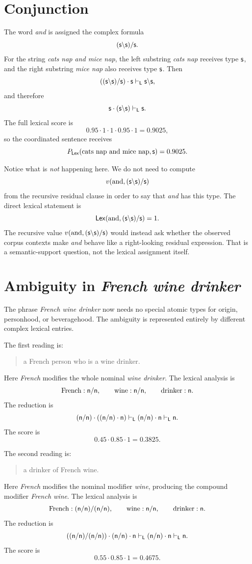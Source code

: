 \section{Conjunction}
The word \emph{and} is assigned the complex formula
\[
(\mathsf{s}\backslash \mathsf{s})/\mathsf{s}.
\]
For the string \emph{cats nap and mice nap}, the left substring \emph{cats nap} receives type
$\mathsf{s}$, and the right substring \emph{mice nap} also receives type $\mathsf{s}$. Then
\[
((\mathsf{s}\backslash \mathsf{s})/\mathsf{s})\mathbin{\cdot} \mathsf{s}
\vdash_{\mathsf{L}}
\mathsf{s}\backslash \mathsf{s},
\]
and therefore
\[
\mathsf{s}\mathbin{\cdot}(\mathsf{s}\backslash \mathsf{s})\vdash_{\mathsf{L}}\mathsf{s}.
\]
The full lexical score is
\[
0.95\cdot1\cdot1\cdot0.95\cdot1=0.9025,
\]
so the coordinated sentence receives
\[
P_{\mathsf{Lex}}(\text{cats nap and mice nap},\mathsf{s})=0.9025.
\]

Notice what is \emph{not} happening here. We do not need to compute
\[
v(\text{and},(\mathsf{s}\backslash \mathsf{s})/\mathsf{s})
\]
from the recursive residual clause in order to say that \emph{and} has this type. The direct
lexical statement is
\[
\mathsf{Lex}(\text{and},(\mathsf{s}\backslash \mathsf{s})/\mathsf{s})=1.
\]
The recursive value $v(\text{and},(\mathsf{s}\backslash \mathsf{s})/\mathsf{s})$ would instead ask whether the
observed corpus contexts make \emph{and} behave like a right-looking residual expression. That
is a semantic-support question, not the lexical assignment itself.

\section{Ambiguity in \emph{French wine drinker}}
The phrase \emph{French wine drinker} now needs no special atomic types for origin, personhood,
or beveragehood. The ambiguity is represented entirely by different complex lexical entries.

The first reading is:
\begin{quote}
a French person who is a wine drinker.
\end{quote}
Here \emph{French} modifies the whole nominal \emph{wine drinker}. The lexical analysis is
\[
\text{French}:\mathsf{n}/\mathsf{n},
\qquad
\text{wine}:\mathsf{n}/\mathsf{n},
\qquad
\text{drinker}:\mathsf{n}.
\]
The reduction is
\[
(\mathsf{n}/\mathsf{n})\mathbin{\cdot}((\mathsf{n}/\mathsf{n})\mathbin{\cdot} \mathsf{n})
\vdash_{\mathsf{L}}
(\mathsf{n}/\mathsf{n})\mathbin{\cdot} \mathsf{n}
\vdash_{\mathsf{L}}
\mathsf{n}.
\]
The score is
\[
0.45\cdot0.85\cdot1=0.3825.
\]

The second reading is:
\begin{quote}
a drinker of French wine.
\end{quote}
Here \emph{French} modifies the nominal modifier \emph{wine}, producing the compound modifier
\emph{French wine}. The lexical analysis is
\[
\text{French}:(\mathsf{n}/\mathsf{n})/(\mathsf{n}/\mathsf{n}),
\qquad
\text{wine}:\mathsf{n}/\mathsf{n},
\qquad
\text{drinker}:\mathsf{n}.
\]
The reduction is
\[
((\mathsf{n}/\mathsf{n})/(\mathsf{n}/\mathsf{n}))
\mathbin{\cdot}(\mathsf{n}/\mathsf{n})
\mathbin{\cdot} \mathsf{n}
\vdash_{\mathsf{L}}
(\mathsf{n}/\mathsf{n})\mathbin{\cdot} \mathsf{n}
\vdash_{\mathsf{L}}
\mathsf{n}.
\]
The score is
\[
0.55\cdot0.85\cdot1=0.4675.
\]

